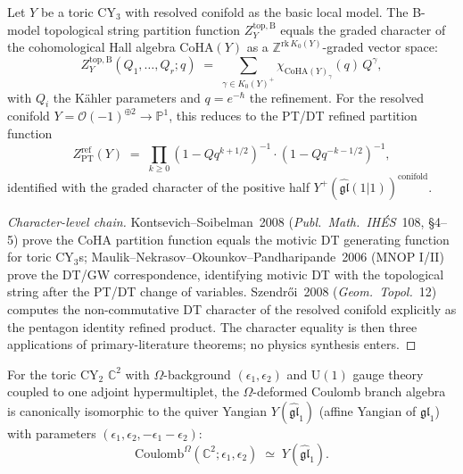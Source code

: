 \begin{theorem}[Character-level M-theory parent: $Z^{\mathrm{top, B}}_Y = \chi_{\mathrm{CoHA}(Y)}$]
\label{thm:m-theory-parent-character-level}
Let $Y$ be a toric CY$_3$ with resolved conifold as the basic local model. The B-model topological string partition function $Z^{\mathrm{top, B}}_Y$ equals the graded character of the cohomological Hall algebra $\mathrm{CoHA}(Y)$ as a $\mathbb{Z}^{\mathrm{rk}\,K_0(Y)}$-graded vector space:
\[
 Z^{\mathrm{top, B}}_Y(Q_1, \ldots, Q_r; q) \;=\; \sum_{\gamma \in K_0(Y)^+} \chi_{\mathrm{CoHA}(Y)_\gamma}(q)\, Q^\gamma,
\]
with $Q_i$ the K\"ahler parameters and $q = e^{-\hbar}$ the refinement. For the resolved conifold $Y = \mathcal{O}(-1)^{\oplus 2} \to \mathbb{P}^1$, this reduces to the PT/DT refined partition function
\[
 Z^{\mathrm{ref}}_{\mathrm{PT}}(Y) \;=\; \prod_{k \geq 0} (1 - Q q^{k + 1/2})^{-1} \cdot (1 - Q q^{-k - 1/2})^{-1},
\]
identified with the graded character of the positive half $Y^+(\widehat{\mathfrak{gl}}(1|1))^{\mathrm{conifold}}$.
\end{theorem}

\begin{proof}[Character-level chain]
Kontsevich--Soibelman~2008 (\emph{Publ.\ Math.\ IH\'ES}~108, \S4--5) prove the CoHA partition function equals the motivic DT generating function for toric CY$_3$s; Maulik--Nekrasov--Okounkov--Pandharipande~2006 (MNOP I/II) prove the DT/GW correspondence, identifying motivic DT with the topological string after the PT/DT change of variables. Szendr\H{o}i~2008 (\emph{Geom.\ Topol.}~12) computes the non-commutative DT character of the resolved conifold explicitly as the pentagon identity refined product. The character equality is then three applications of primary-literature theorems; no physics synthesis enters.
\end{proof}

\begin{theorem}[Toric $\mathbb{C}^2$: $\Omega$-deformed Coulomb $=$ quiver Yangian]
\label{thm:toric-c2-omega-coulomb-quiver-yangian}
For the toric CY$_2$ $\mathbb{C}^2$ with $\Omega$-background $(\epsilon_1, \epsilon_2)$ and $\mathrm{U}(1)$ gauge theory coupled to one adjoint hypermultiplet, the $\Omega$-deformed Coulomb branch algebra is canonically isomorphic to the quiver Yangian $Y(\widehat{\mathfrak{gl}}_1)$ (affine Yangian of $\mathfrak{gl}_1$) with parameters $(\epsilon_1, \epsilon_2, -\epsilon_1 - \epsilon_2)$:
\[
 \mathrm{Coulomb}^\Omega(\mathbb{C}^2; \epsilon_1, \epsilon_2) \;\simeq\; Y(\widehat{\mathfrak{gl}}_1).
\]
\end{theorem}

